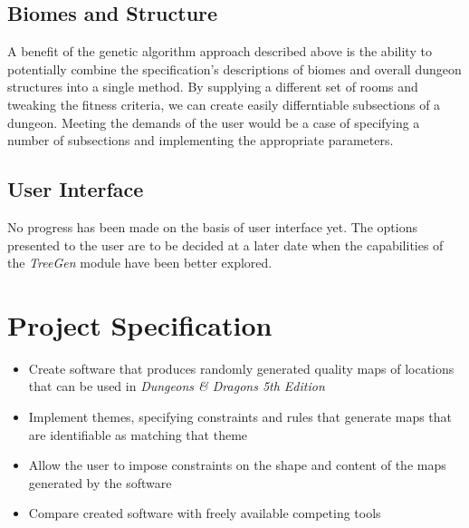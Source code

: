 \documentclass{article}
\begin{document}
\subsection{Biomes and Structure}
A benefit of the genetic algorithm approach described above is the ability to potentially combine the specification's descriptions of biomes and overall dungeon structures into a single method. By supplying a different set of rooms and tweaking the fitness criteria, we can create easily differntiable subsections of a dungeon. Meeting the demands of the user would be a case of specifying a number of subsections and implementing the appropriate parameters.

\subsection{User Interface}
No progress has been made on the basis of user interface yet. The options presented to the user are to be decided at a later date when the capabilities of the \textit{TreeGen} module have been better explored. 


\pagebreak




\pagebreak

\appendix
\section{Project Specification}

\begin{itemize}
    \item Create software that produces randomly generated quality maps of locations that can be used in \textit{Dungeons \& Dragons 5th Edition}
    \item Implement themes, specifying constraints and rules that generate maps that are identifiable as matching that theme
    \item Allow the user to impose constraints on the shape and content of the maps generated by the software
    \item Compare created software with freely available competing tools
\end{itemize}
\end{document}
